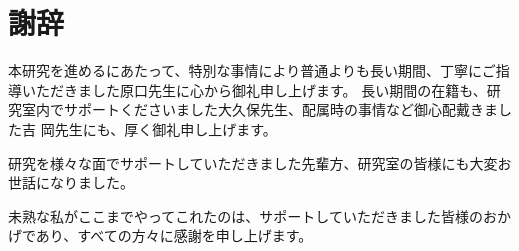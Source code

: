 \chapter*{謝辞}
本研究を進めるにあたって、特別な事情により普通よりも長い期間、丁寧にご指導いただきました原口先生に心から御礼申し上げます。
長い期間の在籍も、研究室内でサポートくださいました大久保先生、配属時の事情など御心配戴きました吉
岡先生にも、厚く御礼申し上げます。

研究を様々な面でサポートしていただきました先輩方、研究室の皆様にも大変お世話になりました。

未熟な私がここまでやってこれたのは、サポートしていただきました皆様のおかげであり、すべての方々に感謝を申し上げます。

\begin{flushright}
\end{flushright}
